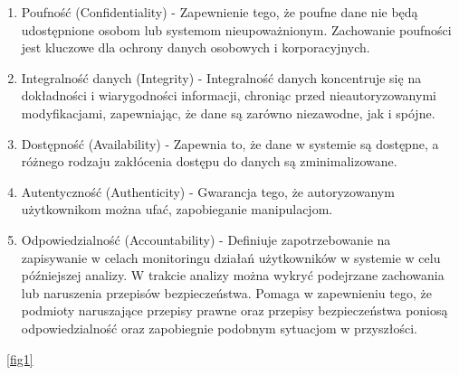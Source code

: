 \documentclass[runningheads,12pt]{llncs}
\begin{document}
\begin{enumerate}
    \item Poufność (Confidentiality) - Zapewnienie tego, że poufne dane nie będą udostępnione osobom lub systemom nieupoważnionym. Zachowanie poufności jest kluczowe dla ochrony danych osobowych i korporacyjnych. ~\cite[p. 22]{stallings2017cryptography}
    \item Integralność danych (Integrity) - Integralność danych koncentruje się na dokładności i wiarygodności informacji, chroniąc przed nieautoryzowanymi modyfikacjami, zapewniając, że dane są zarówno niezawodne, jak i spójne.  ~\cite[p. 22]{stallings2017cryptography}
    \item Dostępność (Availability) - Zapewnia to, że dane w systemie są dostępne, a różnego rodzaju zakłócenia dostępu do danych są zminimalizowane.  ~\cite[p. 22]{stallings2017cryptography}
    \item Autentyczność (Authenticity) - Gwarancja tego, że autoryzowanym użytkownikom można ufać, zapobieganie manipulacjom. ~\cite[p. 23]{stallings2017cryptography}
    \item Odpowiedzialność (Accountability) - Definiuje zapotrzebowanie na zapisywanie w celach monitoringu działań użytkowników w systemie w celu późniejszej analizy. W trakcie analizy można wykryć podejrzane zachowania lub naruszenia przepisów bezpieczeństwa. Pomaga w zapewnieniu tego, że podmioty naruszające przepisy prawne oraz przepisy bezpieczeństwa poniosą odpowiedzialność oraz zapobiegnie podobnym sytuacjom w przyszłości. ~\cite[p. 23]{stallings2017cryptography}
\end{enumerate}


~\ref{fig1}
\end{document}
